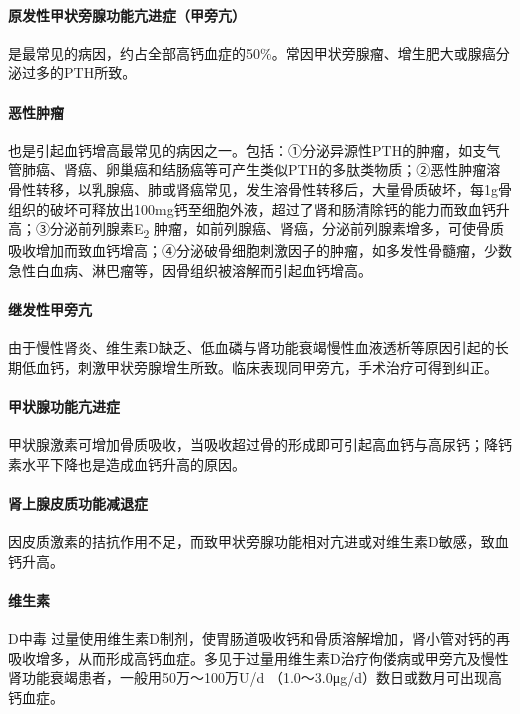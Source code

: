 \paragraph{原发性甲状旁腺功能亢进症（甲旁亢）}

是最常见的病因，约占全部高钙血症的50\%。常因甲状旁腺瘤、增生肥大或腺癌分泌过多的PTH所致。

\paragraph{恶性肿瘤}

也是引起血钙增高最常见的病因之一。包括：①分泌异源性PTH的肿瘤，如支气管肺癌、肾癌、卵巢癌和结肠癌等可产生类似PTH的多肽类物质；②恶性肿瘤溶骨性转移，以乳腺癌、肺或肾癌常见，发生溶骨性转移后，大量骨质破坏，每1g骨组织的破坏可释放出100mg钙至细胞外液，超过了肾和肠清除钙的能力而致血钙升高；③分泌前列腺素E\textsubscript{2}
肿瘤，如前列腺癌、肾癌，分泌前列腺素增多，可使骨质吸收增加而致血钙增高；④分泌破骨细胞刺激因子的肿瘤，如多发性骨髓瘤，少数急性白血病、淋巴瘤等，因骨组织被溶解而引起血钙增高。

\paragraph{继发性甲旁亢}

由于慢性肾炎、维生素D缺乏、低血磷与肾功能衰竭慢性血液透析等原因引起的长期低血钙，刺激甲状旁腺增生所致。临床表现同甲旁亢，手术治疗可得到纠正。

\paragraph{甲状腺功能亢进症}

甲状腺激素可增加骨质吸收，当吸收超过骨的形成即可引起高血钙与高尿钙；降钙素水平下降也是造成血钙升高的原因。

\paragraph{肾上腺皮质功能减退症}

因皮质激素的拮抗作用不足，而致甲状旁腺功能相对亢进或对维生素D敏感，致血钙升高。

\paragraph{维生素}

D中毒
过量使用维生素D制剂，使胃肠道吸收钙和骨质溶解增加，肾小管对钙的再吸收增多，从而形成高钙血症。多见于过量用维生素D治疗佝偻病或甲旁亢及慢性肾功能衰竭患者，一般用50万～100万U/d
（1.0～3.0μg/d）数日或数月可出现高钙血症。

